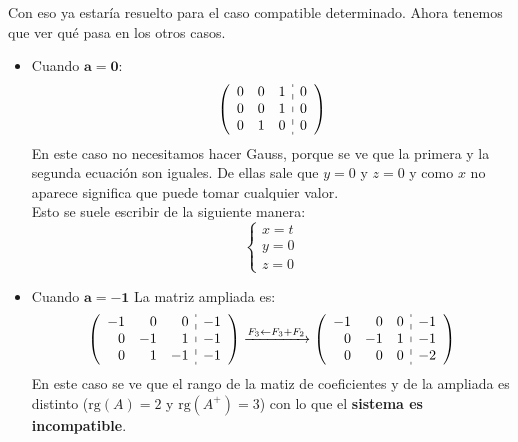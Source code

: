 \documentclass[a4paper,11pt,answers]{exam}
\newcommand\rango[1]{\mathrm{rg}(#1)}
\begin{document}
\begin{questions}
\begin{solution}
	Con eso ya estaría resuelto para el caso compatible determinado. Ahora tenemos que ver qué pasa en los otros casos.
	\begin{itemize}
		\item Cuando $\boldsymbol{a=0}$:
		\[\left(\begin{array}{rrr:r}
			0&0&1&0\\
			0&0&1&0\\
			0&1&0&0
		\end{array}\right)\]
	En este caso no necesitamos hacer Gauss, porque se ve que la primera y la segunda ecuación son iguales. De ellas sale que $y=0$ y $z=0$ y como $x$ no aparece significa que puede tomar cualquier valor.\\
	Esto se suele escribir de la siguiente manera:
	\[\left\lbrace \begin{array}{l}
		x=t\\
		y=0\\
		z=0
	\end{array}\right.\]
      \item Cuando $\boldsymbol{a=-1}$
        La matriz ampliada es:
        \[\left(\begin{array}{rrr:r}
		-1&0&0&-1\\
		0&-1&1&-1\\
		0&1&-1&-1
	\end{array}\right) \xrightarrow{F_3 \leftarrow F_3 + F_2}
        \left(\begin{array}{rrr:r}
		-1&0&0&-1\\
		0&-1&1&-1\\
		0&0&0&-2
	\end{array}\right)\]
        En este caso se ve que el rango de la matiz de coeficientes y de la ampliada es distinto ($\rango{A}=2$ y $\rango{A^+} = 3$) con lo que el \textbf{sistema es incompatible}.


\end{itemize}
\end{solution}
\end{questions}
\end{document}

